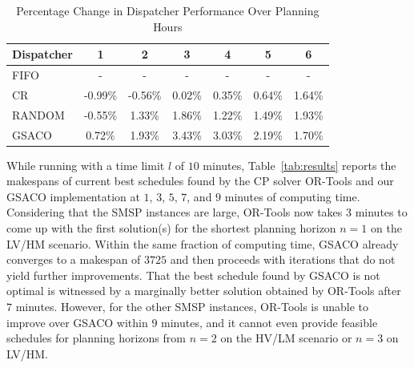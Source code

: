 \documentclass[runningheads]{llncs}
\begin{document}
\begin{table}[t]
	\caption{Percentage Change in Dispatcher Performance Over Planning Hours} \label{tab:dispatchers} \centering
	\begin{tabular}{|l|c|c|c|c|c|c|}
		\hline
		\textbf{Dispatcher} & \textbf{1} & \textbf{2} & \textbf{3} & \textbf{4} & \textbf{5} & \textbf{6} \\
		\hline 
		FIFO     & -    & -    & -    & -    & -    & -    \\
		CR       & -0.99\% & -0.56\% & 0.02\% & 0.35\% & 0.64\% & 1.64\% \\
		RANDOM   & -0.55\% & 1.33\% & 1.86\% & 1.22\% & 1.49\% & 1.93\% \\
		GSACO    & 0.72\% & 1.93\% & 3.43\% & 3.03\% & 2.19\% & 1.70\% \\
		\hline
	\end{tabular}
\end{table}


%
While running with a time limit $l$ of $10$ minutes,
Table~\ref{tab:results} reports the makespans of current best schedules
found by the CP solver OR-Tools and our GSACO implementation
at $1$, $3$, $5$, $7$, and $9$ minutes of computing time.
Considering that the SMSP instances are large,
OR-Tools now takes $3$ minutes to come up with the first solution(s)
for the shortest planning horizon $n=1$ on the LV/HM scenario.
Within the same fraction of computing time, GSACO already converges to a
makespan of $3725$ and then proceeds with iterations that do not
yield further improvements.
That the best schedule found by GSACO is not optimal is witnessed by a
marginally better solution obtained by OR-Tools after $7$ minutes.
However, for the other SMSP instances, OR-Tools is unable to improve over
GSACO within $9$ minutes, and it cannot even provide feasible schedules
for planning horizons from $n=2$ on the HV/LM scenario or $n=3$ 
on LV/HM.
\end{document}
